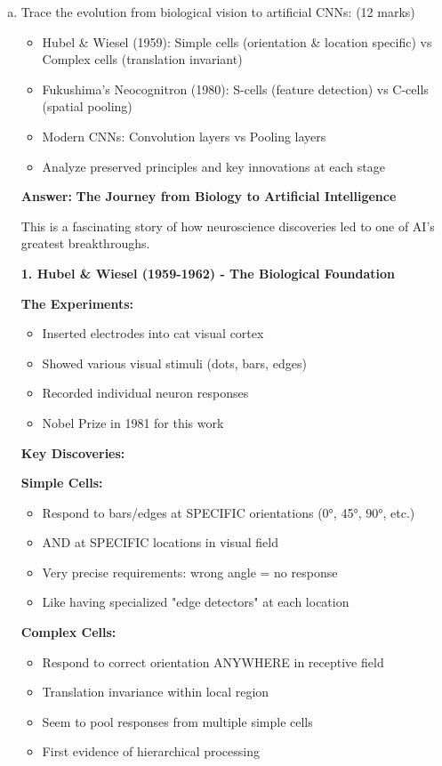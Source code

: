 \documentclass[12pt]{article}
\newcommand{\answer}[1]{{\color{answercolor}\textbf{Answer:} #1}}
\newcommand{\explanation}[1]{{\color{explanationcolor}#1}}
\begin{document}
\begin{enumerate}[(a)]
    \item Trace the evolution from biological vision to artificial CNNs: \hfill (12 marks)
    \begin{itemize}
        \item Hubel \& Wiesel (1959): Simple cells (orientation \& location specific) vs Complex cells (translation invariant)
        \item Fukushima's Neocognitron (1980): S-cells (feature detection) vs C-cells (spatial pooling)
        \item Modern CNNs: Convolution layers vs Pooling layers
        \item Analyze preserved principles and key innovations at each stage
    \end{itemize}
    
    \answer{
    \textbf{The Journey from Biology to Artificial Intelligence}
    
    \explanation{
    This is a fascinating story of how neuroscience discoveries led to one of AI's greatest breakthroughs.
    }
    
    \textbf{1. Hubel \& Wiesel (1959-1962) - The Biological Foundation}
    
    \explanation{
    \textbf{The Experiments:}
    \begin{itemize}
        \item Inserted electrodes into cat visual cortex
        \item Showed various visual stimuli (dots, bars, edges)
        \item Recorded individual neuron responses
        \item Nobel Prize in 1981 for this work
    \end{itemize}
    
    \textbf{Key Discoveries:}
    
    \textbf{Simple Cells:}
    \begin{itemize}
        \item Respond to bars/edges at SPECIFIC orientations (0°, 45°, 90°, etc.)
        \item AND at SPECIFIC locations in visual field
        \item Very precise requirements: wrong angle = no response
        \item Like having specialized "edge detectors" at each location
    \end{itemize}
    
    \textbf{Complex Cells:}
    \begin{itemize}
        \item Respond to correct orientation ANYWHERE in receptive field
        \item Translation invariance within local region
        \item Seem to pool responses from multiple simple cells
        \item First evidence of hierarchical processing
    \end{itemize}
    
}}
\end{enumerate}
\end{document}
